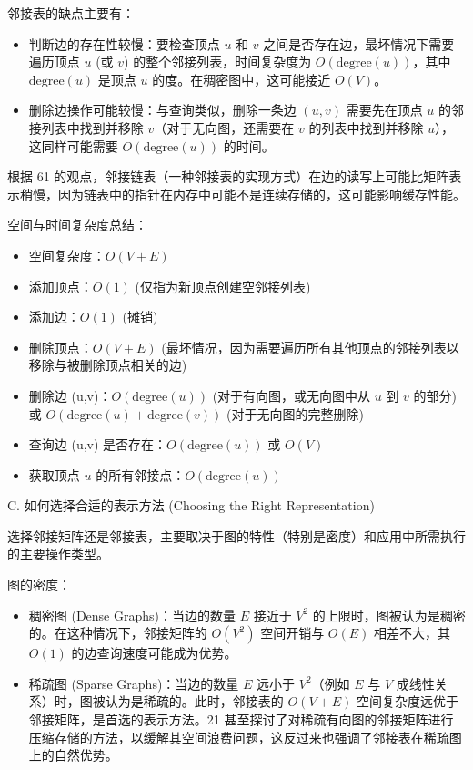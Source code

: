 邻接表的缺点主要有：

\begin{itemize}
	\item 判断边的存在性较慢：要检查顶点 $u$ 和 $v$ 之间是否存在边，最坏情况下需要遍历顶点 $u$ (或 $v$) 的整个邻接列表，时间复杂度为 $O(\text{degree}(u))$，其中 $\text{degree}(u)$ 是顶点 $u$ 的度。在稠密图中，这可能接近 $O(V)$。
	\item 删除边操作可能较慢：与查询类似，删除一条边 $(u,v)$ 需要先在顶点 $u$ 的邻接列表中找到并移除 $v$（对于无向图，还需要在 $v$ 的列表中找到并移除 $u$），这同样可能需要 $O(\text{degree}(u))$ 的时间。
\end{itemize}

根据 61 的观点，邻接链表（一种邻接表的实现方式）在边的读写上可能比矩阵表示稍慢，因为链表中的指针在内存中可能不是连续存储的，这可能影响缓存性能。

空间与时间复杂度总结：

\begin{itemize}
	\item 空间复杂度：$O(V+E)$
	\item 添加顶点：$O(1)$ (仅指为新顶点创建空邻接列表)
	\item 添加边：$O(1)$ (摊销)
	\item 删除顶点：$O(V+E)$ (最坏情况，因为需要遍历所有其他顶点的邻接列表以移除与被删除顶点相关的边)
	\item 删除边 (u,v)：$O(\text{degree}(u))$ (对于有向图，或无向图中从 $u$ 到 $v$ 的部分) 或 $O(\text{degree}(u)+\text{degree}(v))$ (对于无向图的完整删除)
	\item 查询边 (u,v) 是否存在：$O(\text{degree}(u))$ 或 $O(V)$
	\item 获取顶点 $u$ 的所有邻接点：$O(\text{degree}(u))$
\end{itemize}

C. 如何选择合适的表示方法 (Choosing the Right Representation)

选择邻接矩阵还是邻接表，主要取决于图的特性（特别是密度）和应用中所需执行的主要操作类型。

图的密度：

\begin{itemize}
	\item 稠密图 (Dense Graphs)：当边的数量 $E$ 接近于 $V^2$ 的上限时，图被认为是稠密的。在这种情况下，邻接矩阵的 $O(V^2)$ 空间开销与 $O(E)$ 相差不大，其 $O(1)$ 的边查询速度可能成为优势。
	\item 稀疏图 (Sparse Graphs)：当边的数量 $E$ 远小于 $V^2$（例如 $E$ 与 $V$ 成线性关系）时，图被认为是稀疏的。此时，邻接表的 $O(V+E)$ 空间复杂度远优于邻接矩阵，是首选的表示方法。21 甚至探讨了对稀疏有向图的邻接矩阵进行压缩存储的方法，以缓解其空间浪费问题，这反过来也强调了邻接表在稀疏图上的自然优势。
\end{itemize}

